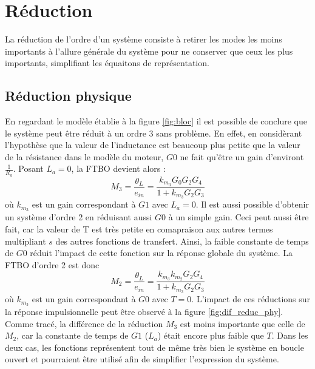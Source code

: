 \documentclass{udes_rapport} %
\begin{document}
\section{Réduction}
La réduction de l'ordre d'un système consiste à retirer les modes les moins importants à l'allure générale du système pour ne conserver que ceux les plus importants, simplifiant les équaitons de représentation.
\subsection{Réduction physique}
En regardant le modèle établie à la figure \ref{fig:bloc} il est possible de conclure que le système peut être réduit à un ordre 3 sans problème. En effet, en considèrant l'hypothèse que la valeur de l'inductance est beaucoup plus petite que la valeur de la résistance dans le modèle du moteur, $G0$ ne fait qu'être un gain d'environt $\frac{1}{R_a}$. Posant $L_a = 0$, la FTBO devient alors :
\begin{equation}
M_3 = \frac{\theta_L}{e_{in}} = \frac{k_{m_3} G_0 G_2 G_4}{1 + k_{m_3} G_2 G_3}
\end{equation}
où $k_{m_3}$ est un gain correspondant à $G1$ avec $L_a = 0$.
Il est aussi possible d'obtenir un système d'ordre 2 en  réduisant aussi $G0$ à un simple gain. Ceci peut aussi être fait, car la valeur de T est très petite en comapraison aux autres termes multipliant $s$ des autres fonctions de transfert. Ainsi, la faible constante de temps de $G0$ réduit l'impact de cette fonction sur la réponse globale du système. La FTBO d'ordre 2 est donc
\begin{equation}
M_2 = \frac{\theta_L}{e_{in}} = \frac{k_{m_3} k_{m_2} G_2 G_4}{1 + k_{m_3} G_2 G_3}
\end{equation}
où $k_{m_3}$ est un gain correspondant à $G0$ avec $T = 0$.
L'impact de ces réductions sur la réponse impulsionnelle peut être observé à la figure \ref{fig:dif_reduc_phy}. Comme tracé, la différence de la réduction $M_3$ est moins importante que celle de $M_2$, car la constante de temps de $G1$ ($L_a$) était encore plus faible que $T$. Dans les deux cas, les fonctions représentent tout de même très bien le  système en boucle ouvert et pourraient être utilisé afin de simplifier l'expression du système.
\end{document}
